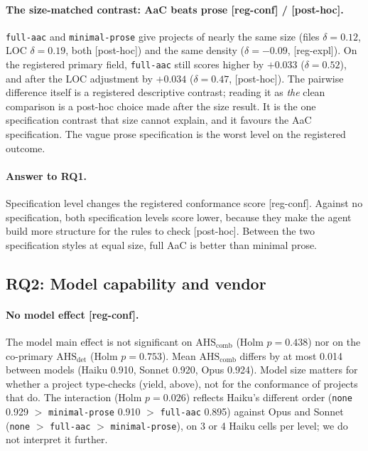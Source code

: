 \documentclass[10pt,a4paper]{article}
\newcommand{\regC}{\textsf{\scriptsize[reg-conf]}}  %
\newcommand{\regX}{\textsf{\scriptsize[reg-expl]}}  %
\newcommand{\ph}{\textsf{\scriptsize[post-hoc]}}    %
\newcommand{\lev}[1]{\texttt{\small #1}}
\newcommand{\AHSc}{\mathrm{AHS}_{\mathrm{comb}}}
\newcommand{\AHSd}{\mathrm{AHS}_{\mathrm{det}}}
\begin{document}
\paragraph{The size-matched contrast: AaC beats prose \regC{} / \ph{}.} \lev{full-aac} and \lev{minimal-prose} give
projects of nearly the same size (files $\delta = 0.12$, LOC $\delta = 0.19$, both \ph{}) and the same density
($\delta = -0.09$, \regX{}). %
On the registered primary field, \lev{full-aac} still scores higher by $+0.033$ ($\delta = 0.52$), and after the
LOC adjustment by $+0.034$ ($\delta = 0.47$, \ph{}). %
The pairwise difference itself is a registered descriptive contrast; reading it as \emph{the} clean comparison is a
post-hoc choice made after the size result. It is the one specification contrast that size cannot explain, and it
favours the AaC specification. The vague prose specification is the worst level on the registered outcome.

\paragraph{Answer to RQ1.} Specification level changes the registered conformance score \regC{}. Against no
specification, both specification levels score lower, because they make the agent build more structure for the
rules to check \ph{}. Between the two specification styles at equal size, full AaC is better than minimal prose.

\subsection{RQ2: Model capability and vendor}\label{sec:rq2}

\paragraph{No model effect \regC{}.} The model main effect is not significant on $\AHSc$ (Holm $p = 0.438$) nor on
the co-primary $\AHSd$ (Holm $p = 0.753$). %
Mean $\AHSc$ differs by at most 0.014 between models (Haiku 0.910, Sonnet 0.920, Opus 0.924).
Model size matters for whether a project type-checks (yield, above), not for the conformance of projects that do.
The interaction (Holm $p = 0.026$) reflects Haiku's different order (\lev{none} 0.929 $>$ \lev{minimal-prose} 0.910
$>$ \lev{full-aac} 0.895) against Opus and Sonnet (\lev{none} $>$ \lev{full-aac} $>$ \lev{minimal-prose}), on 3 or 4
Haiku cells per level; we do not interpret it further. %
\end{document}
